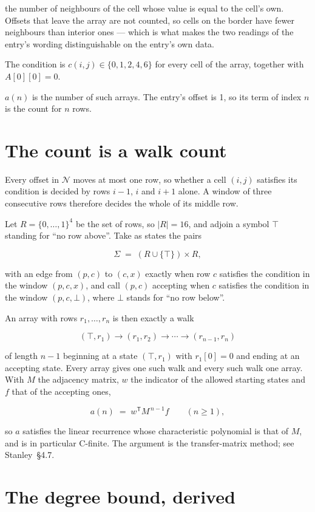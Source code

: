 \documentclass[11pt]{article}
\theoremstyle{definition}
\begin{document}
the number of neighbours of the cell whose value is equal to the cell's own. Offsets that leave the array are not counted, so cells on the border have fewer neighbours than interior ones --- which is what makes the two readings of the entry's wording distinguishable on the entry's own data.

The condition is $c(i,j) \in \{0, 1, 2, 4, 6\}$ for every cell of the array, together with $A[0][0]=0$.

$a(n)$ is the number of such arrays. The entry's offset is 1, so its term of index $n$ is the count for $n$ rows.

\section{The count is a walk count}

Every offset in $\mathcal{N}$ moves at most one row, so whether a cell $(i,j)$ satisfies its condition is decided by rows $i-1$, $i$ and $i+1$ alone. A window of three consecutive rows therefore decides the whole of its middle row.

Let $R = \{0,\dots,1\}^{4}$ be the set of rows, so $|R| = 16$, and adjoin a symbol $\top$ standing for ``no row above''. Take as states the pairs

\[\Sigma \;=\; (R \cup \{\top\}) \times R,\]

with an edge from $(p,c)$ to $(c,x)$ exactly when row $c$ satisfies the condition in the window $(p,c,x)$, and call $(p,c)$ accepting when $c$ satisfies the condition in the window $(p,c,\bot)$, where $\bot$ stands for ``no row below''.

An array with rows $r_1,\dots,r_n$ is then exactly a walk

\[(\top,r_1) \to (r_1,r_2) \to \cdots \to (r_{n-1},r_n)\]

of length $n-1$ beginning at a state $(\top,r_1)$ with $r_1[0]=0$ and ending at an accepting state. Every array gives one such walk and every such walk one array. With $M$ the adjacency matrix, $w$ the indicator of the allowed starting states and $f$ that of the accepting ones,

\[a(n) \;=\; w^{\mathsf T} M^{\,n-1} f \qquad (n \ge 1),\]

so $a$ satisfies the linear recurrence whose characteristic polynomial is that of $M$, and is in particular C-finite. The argument is the transfer-matrix method; see Stanley~\S4.7.

\section{The degree bound, derived}
\end{document}
